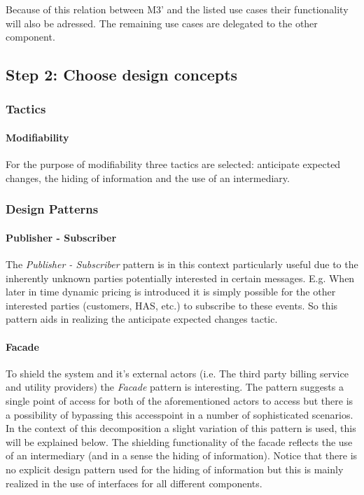 \npar Because of this relation between M3' and the listed use cases their
functionality will also be adressed. The remaining use cases are delegated to
the other component. %

\subsection{Step 2: Choose design concepts}
\label{add:it10/concepts}

\subsubsection{Tactics}
\label{add:it10/tactics}

\paragraph{Modifiability}

\npar For the purpose of modifiability three tactics are selected: anticipate
expected changes, the hiding of information and the use of an intermediary.

\subsubsection{Design Patterns}
\label{add:it10/patterns}

\paragraph{Publisher - Subscriber}

\npar The \emph{Publisher - Subscriber} pattern is in this context particularly useful due to
the inherently unknown parties potentially interested in certain messages. E.g. When
later in time dynamic pricing is introduced it is simply possible for the other
interested parties (customers, HAS, etc.) to subscribe to these events. So this
pattern aids in realizing the anticipate expected changes tactic.

\paragraph{Facade}

\npar To shield the system and it's external actors (i.e. The third party
billing service and utility providers) the \emph{Facade} pattern is interesting.
The pattern suggests a single point of access for both of the aforementioned
actors to access but there is a possibility of bypassing this accesspoint in a
number of sophisticated scenarios. In the context of this decomposition a slight
variation of this pattern is used, this will be explained below. The shielding
functionality of the facade reflects the use of an intermediary (and in a sense
the hiding of information). Notice that there is no explicit design pattern used
for the hiding of information but this is mainly realized in the use of
interfaces for all different components.

